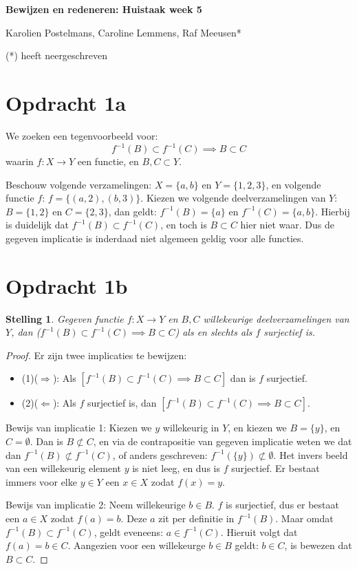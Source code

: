 \documentclass[12pt,a4paper]{article}
\newtheorem{stelling}{Stelling}
\begin{document}
\begin{center}
{\Large\bf Bewijzen en redeneren: Huistaak week 5} \par\vspace{.5em}
{Karolien Postelmans, Caroline Lemmens, Raf Meeusen*}
\end{center}


(*) heeft neergeschreven

\section*{Opdracht 1a}

We zoeken een tegenvoorbeeld voor: 
\[  f^{-1}(B) \subset f^{-1}(C)  \implies  B  \subset C  \]
waarin $f: X \rightarrow Y$ een functie, en $B,C \subset Y$. 

Beschouw volgende verzamelingen: 
$X = \{a,b\}$ en $Y=\{1,2,3\}$, en volgende functie $f$: $f = \{ (a,2), (b,3) \}$. 
Kiezen we  volgende deelverzamelingen van $Y$: $B=\{1,2\}$ en $C=\{2,3\}$, dan geldt: $f^{-1}(B) = \{ a \} $ en $f^{-1}(C) = \{ a, b\} $. Hierbij is duidelijk dat $f^{-1}(B) \subset f^{-1}(C)$, en toch is $B \subset C$ hier niet waar. Dus de gegeven implicatie is inderdaad niet algemeen geldig voor alle functies. 

\section*{Opdracht 1b}

\begin{stelling}  
Gegeven functie $f: X \rightarrow Y$ en $B,C$ willekeurige deelverzamelingen van $Y$, dan
($f^{-1}(B) \subset f^{-1}(C)  \implies  B  \subset C$) 
als en slechts als $f$ surjectief is. 

\end{stelling}



\begin{proof} 
Er zijn twee implicaties te bewijzen:  
\begin{itemize}
\item (1)($\Rightarrow$): Als $[f^{-1}(B) \subset f^{-1}(C)  \implies  B  \subset C ]$ dan is $f$ surjectief. 
\item (2)($\Leftarrow$): Als $f$ surjectief is, dan $[f^{-1}(B) \subset f^{-1}(C)  \implies  B  \subset C ]$. 
\end{itemize}
Bewijs van implicatie 1: 
Kiezen we $y$ willekeurig in $Y$, en kiezen we $B = \{ y \}$,  en $C = \emptyset$. Dan is $B \not\subset C$, en via de contrapositie van gegeven implicatie weten we dat dan $f^{-1}(B) \not\subset f^{-1}(C)$, of anders geschreven: $f^{-1}(\{y\}) \not\subset \emptyset$. Het invers beeld van een willekeurig element $y$ is niet leeg, en dus is $f$ surjectief. Er bestaat immers voor elke $y \in Y$ een $x \in X$ zodat $f(x)=y$. 

Bewijs van implicatie 2: 
Neem willekeurige $b \in B$. $f$ is surjectief, dus er bestaat een $a \in X$
zodat $f(a)=b$. Deze $a$ zit per definitie in $f^{-1}(B)$. Maar omdat  $f^{-1}(B) \subset f^{-1}(C)$, geldt eveneens: $a \in f^{-1}(C)$. Hieruit volgt dat $f(a)=b \in C$. Aangezien voor een willekeurge $b \in B$ geldt: $b \in C$, is bewezen dat $B \subset C$. 
\end{proof}
\end{document}
